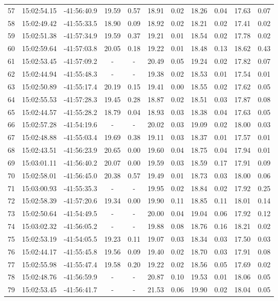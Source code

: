 \begin{longtable}{ccccccccccc}
 57 & 15:02:54.15 & -41:56:40.9 & 19.59 & 0.57 & 18.91 & 0.02 & 18.26 & 0.04 & 17.63 & 0.07\\
 58 & 15:02:49.42 & -41:55:33.5 & 18.90 & 0.09 & 18.92 & 0.02 & 18.21 & 0.02 & 17.41 & 0.02\\
 59 & 15:02:51.38 & -41:57:34.9 & 19.59 & 0.37 & 19.21 & 0.01 & 18.54 & 0.02 & 17.78 & 0.02\\
 60 & 15:02:59.64 & -41:57:03.8 & 20.05 & 0.18 & 19.22 & 0.01 & 18.48 & 0.13 & 18.62 & 0.43\\
 61 & 15:02:53.45 & -41:57:09.2 & - & - & 20.49 & 0.05 & 19.24 & 0.02 & 17.82 & 0.07\\
 62 & 15:02:44.94 & -41:55:48.3 & - & - & 19.38 & 0.02 & 18.53 & 0.01 & 17.54 & 0.01\\
 63 & 15:02:50.89 & -41:55:17.4 & 20.19 & 0.15 & 19.41 & 0.00 & 18.55 & 0.02 & 17.62 & 0.05\\
 64 & 15:02:55.53 & -41:57:28.3 & 19.45 & 0.28 & 18.87 & 0.02 & 18.51 & 0.03 & 17.87 & 0.08\\
 65 & 15:02:44.57 & -41:55:28.2 & 18.79 & 0.04 & 18.93 & 0.03 & 18.38 & 0.04 & 17.63 & 0.05\\
 66 & 15:02:57.28 & -41:54:19.6 & - & - & 20.02 & 0.03 & 19.09 & 0.02 & 18.00 & 0.03\\
 67 & 15:02:48.88 & -41:55:03.4 & 19.69 & 0.38 & 19.11 & 0.03 & 18.37 & 0.01 & 17.57 & 0.01\\
 68 & 15:02:43.51 & -41:56:23.9 & 20.65 & 0.00 & 19.60 & 0.04 & 18.75 & 0.04 & 17.94 & 0.01\\
 69 & 15:03:01.11 & -41:56:40.2 & 20.07 & 0.00 & 19.59 & 0.03 & 18.59 & 0.17 & 17.91 & 0.09\\
 70 & 15:02:58.01 & -41:56:45.0 & 20.38 & 0.57 & 19.49 & 0.01 & 18.73 & 0.03 & 18.00 & 0.06\\
 71 & 15:03:00.93 & -41:55:35.3 & - & - & 19.95 & 0.02 & 18.84 & 0.02 & 17.92 & 0.25\\
 72 & 15:02:58.39 & -41:57:20.6 & 19.34 & 0.00 & 19.90 & 0.11 & 18.85 & 0.11 & 18.01 & 0.14\\
 73 & 15:02:50.64 & -41:54:49.5 & - & - & 20.00 & 0.04 & 19.04 & 0.06 & 17.92 & 0.12\\
 74 & 15:03:02.32 & -41:56:05.2 & - & - & 19.88 & 0.08 & 18.76 & 0.16 & 18.21 & 0.02\\
 75 & 15:02:53.19 & -41:54:05.5 & 19.23 & 0.11 & 19.07 & 0.03 & 18.34 & 0.03 & 17.50 & 0.03\\
 76 & 15:02:44.17 & -41:55:45.8 & 19.56 & 0.09 & 19.40 & 0.02 & 18.70 & 0.03 & 17.91 & 0.08\\
 77 & 15:02:55.98 & -41:55:47.4 & 19.58 & 0.20 & 19.22 & 0.02 & 18.56 & 0.05 & 17.69 & 0.02\\
 78 & 15:02:48.76 & -41:56:59.9 & - & - & 20.87 & 0.10 & 19.53 & 0.01 & 18.06 & 0.05\\
 79 & 15:02:53.45 & -41:56:41.7 & - & - & 21.53 & 0.06 & 19.90 & 0.02 & 18.04 & 0.05\\
\end{longtable}